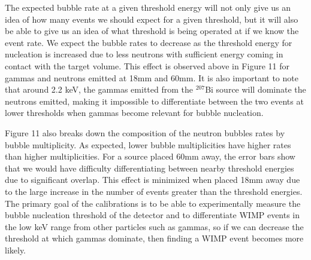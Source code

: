 \documentclass[%
12pt,
twoside,
reprint,
amsmath,amssymb,
aps,
]{article}
\begin{document}
	\par The expected bubble rate at a given threshold energy will not only give us an idea of how many events we should expect for a given threshold, but it will also be able to give us an idea of what threshold is being operated at if we know the event rate. We expect the bubble rates to decrease as the threshold energy for nucleation is increased due to less neutrons with sufficient energy coming in contact with the target volume. This effect is observed above in Figure 11 for gammas and neutrons emitted at 18mm and 60mm. It is also important to note that around 2.2 keV, the gammas emitted from the $^{207}$Bi source will dominate the neutrons emitted, making it impossible to differentiate between the two events at lower thresholds when gammas become relevant for bubble nucleation.
	\par Figure 11 also breaks down the composition of the neutron bubbles rates by bubble multiplicity. As expected, lower bubble multiplicities have higher rates than higher multiplicities. For a source placed 60mm away, the error bars show that we would have difficulty differentiating between nearby threshold energies due to significant overlap. This effect is minimized when placed 18mm away due to the large increase in the number of events greater than the threshold energies. The primary goal of the calibrations is to be able to experimentally measure the bubble nucleation threshold of the detector and to differentiate WIMP events in the low keV range from other particles such as gammas, so if we can decrease the threshold at which gammas dominate, then finding a WIMP event becomes more likely.
\end{document}
